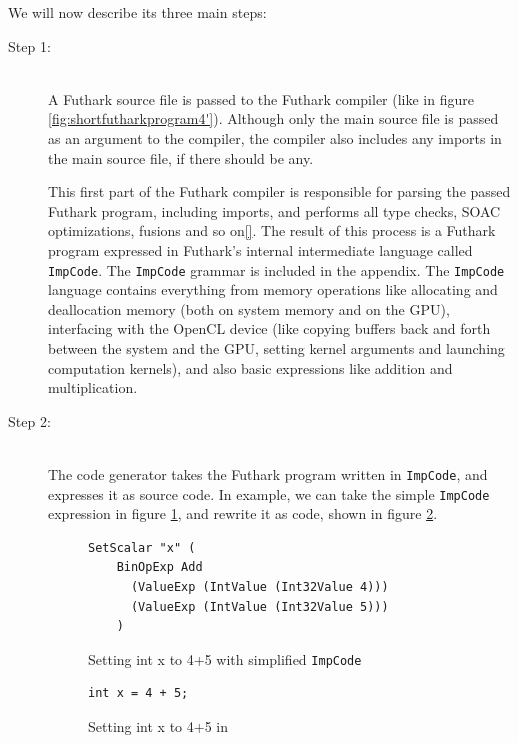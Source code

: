 We will now describe its three main steps:
\begin{description}
\item[Step 1:]\hfill\\
  A Futhark source file is passed to the Futhark compiler (like in figure
  \ref{fig:shortfutharkprogram4'}). Although only the main source file is passed
  as an argument to the compiler, the compiler also includes any imports in the
  main source file, if there should be any.

  This first part of the Futhark compiler is responsible for parsing the passed
  Futhark program, including imports, and performs all type checks, SOAC
  optimizations, fusions and so on\ref{}. The result of this process is a
  Futhark program expressed in Futhark's internal intermediate language called \texttt{ImpCode}.
  The \texttt{ImpCode} grammar is included in the appendix. The \texttt{ImpCode}
  language contains everything from memory operations like allocating and
  deallocation memory (both on system memory and on the GPU), interfacing with
  the OpenCL device (like copying buffers back and forth between the system and
  the GPU, setting kernel arguments and launching computation kernels), and also
  basic expressions like addition and multiplication.

\item[Step 2:]\hfill\\
  The \csharp{} code generator takes the Futhark program written in
  \texttt{ImpCode}, and expresses it as \csharp{} source code.
  In example, we can take the simple \texttt{ImpCode} expression in figure \ref{fig:impcode},
  and rewrite it as \csharp{} code, shown in figure \ref{fig:impcodeascs}.
  \begin{figure}[H]
    \centering
\begin{verbatim}
SetScalar "x" (
    BinOpExp Add 
      (ValueExp (IntValue (Int32Value 4))) 
      (ValueExp (IntValue (Int32Value 5)))
    )
\end{verbatim}
    \caption{Setting int x to 4+5 with simplified \texttt{ImpCode}}
    \label{fig:impcode}
  \end{figure}

\begin{figure}[H]
\centering
\begin{verbatim}
int x = 4 + 5;
\end{verbatim}
\caption{Setting int x to 4+5 in \csharp{}}
\label{fig:impcodeascs}
  \end{figure}


\end{description}
